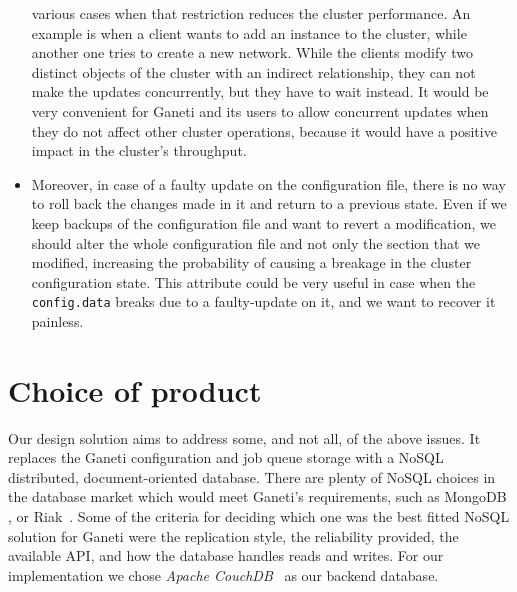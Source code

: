 \begin{itemize}
        various cases when that restriction reduces the cluster performance. An
        example is when a client wants to add an instance to the cluster, while
        another one tries to create a new network. While the clients modify two
        distinct objects of the cluster with an indirect
        relationship, they can not make the updates concurrently, but they have
        to wait instead. It would be very convenient for Ganeti and its users to
        allow concurrent updates when they do not affect other cluster
        operations, because it would have a positive impact in the cluster's
        throughput.
  \item Moreover, in case of a faulty update on the configuration file, there is
        no way to roll back the changes made in it and return to a previous
        state. Even if we keep backups of the configuration file and want to
        revert a modification, we should alter the whole configuration file and
        not only the section that we modified, increasing the probability of
        causing a breakage in the cluster configuration state. This attribute
        could be very useful in case when the \texttt{config.data} breaks due to
        a faulty-update on it, and we want to recover it painless.
\end{itemize}

\section{Choice of product}\label{sec:cho}

Our design solution aims to address some, and not all, of the above issues.
It replaces the Ganeti configuration and job queue storage with a NoSQL
distributed, document-oriented database. There are plenty of NoSQL choices in
the database market which would meet Ganeti's requirements, such as MongoDB
, or Riak~. Some of
the criteria for deciding which one was the best fitted NoSQL solution for
Ganeti were the replication style, the reliability provided, the available API,
and how the database handles reads and writes. For our implementation we chose
\emph{Apache CouchDB}~ as our backend
database.


